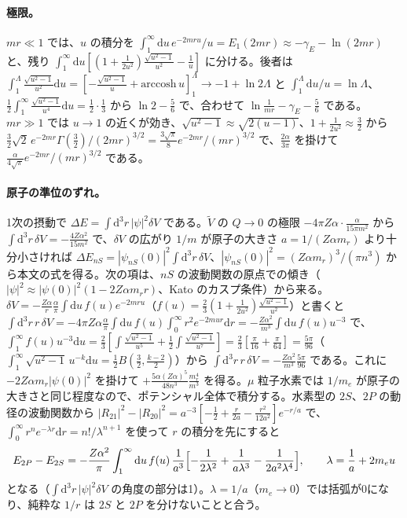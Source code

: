 \documentclass[a4paper,10pt]{ltjsarticle}
\newcommand{\dd}{\mathrm{d}}
\begin{document}
\paragraph{極限。}$mr\ll1$ では、$u$ の積分を $\int_1^\infty\dd u\,e^{-2mru}/u=E_1(2mr)\approx-\gamma_E-\ln(2mr)$ と、残り $\int_1^\infty\dd u[(1+\frac1{2u^2})\frac{\sqrt{u^2-1}}{u^2}-\frac1u]$ に分ける。後者は $\int_1^\Lambda\frac{\sqrt{u^2-1}}{u^2}\dd u=[-\frac{\sqrt{u^2-1}}{u}+\mathrm{arccosh}\,u]_1^\Lambda\to-1+\ln2\Lambda$ と $\int_1^\Lambda\dd u/u=\ln\Lambda$、$\frac12\int_1^\infty\frac{\sqrt{u^2-1}}{u^4}\dd u=\frac12\cdot\frac13$ から $\ln2-\frac56$ で、合わせて $\ln\frac1{mr}-\gamma_E-\frac56$ である。$mr\gg1$ では $u\to1$ の近くが効き、$\sqrt{u^2-1}\approx\sqrt{2(u-1)}$、$1+\frac1{2u^2}\approx\frac32$ から $\frac32\sqrt2\,e^{-2mr}\Gamma(\frac32)/(2mr)^{3/2}=\frac{3\sqrt\pi}{8}e^{-2mr}/(mr)^{3/2}$ で、$\frac{2\alpha}{3\pi}$ を掛けて $\frac{\alpha}{4\sqrt\pi}e^{-2mr}/(mr)^{3/2}$ である。

\paragraph{原子の準位のずれ。}1次の摂動で $\Delta E=\int\dd^3r\,|\psi|^2\delta V$ である。$\tilde V$ の $Q\to0$ の極限 $-4\pi Z\alpha\cdot\frac{\alpha}{15\pi m^2}$ から $\int\dd^3r\,\delta V=-\frac{4Z\alpha^2}{15m^2}$ で、$\delta V$ の広がり $1/m$ が原子の大きさ $a=1/(Z\alpha m_r)$ より十分小さければ $\Delta E_{nS}=|\psi_{nS}(0)|^2\int\dd^3r\,\delta V$、$|\psi_{nS}(0)|^2=(Z\alpha m_r)^3/(\pi n^3)$ から本文の式を得る。次の項は、$nS$ の波動関数の原点での傾き（$|\psi|^2\approx|\psi(0)|^2(1-2Z\alpha m_rr)$、Kato のカスプ条件）から来る。$\delta V=-\frac{Z\alpha}{r}\frac\alpha\pi\int\dd u\,f(u)e^{-2mru}$（$f(u)=\frac23(1+\frac1{2u^2})\frac{\sqrt{u^2-1}}{u^2}$）と書くと $\int\dd^3r\,r\,\delta V=-4\pi Z\alpha\frac\alpha\pi\int\dd u\,f(u)\int_0^\infty r^2e^{-2mur}\dd r=-\frac{Z\alpha^2}{m^3}\int\dd u\,f(u)u^{-3}$ で、$\int_1^\infty f(u)u^{-3}\dd u=\frac23[\int\frac{\sqrt{u^2-1}}{u^5}+\frac12\int\frac{\sqrt{u^2-1}}{u^7}]=\frac23[\frac\pi{16}+\frac\pi{64}]=\frac{5\pi}{96}$（$\int_1^\infty\sqrt{u^2-1}\,u^{-k}\dd u=\frac12B(\frac32,\frac{k-2}{2})$）から $\int\dd^3r\,r\,\delta V=-\frac{Z\alpha^2}{m^3}\frac{5\pi}{96}$ である。これに $-2Z\alpha m_r|\psi(0)|^2$ を掛けて $+\frac{5\alpha(Z\alpha)^5}{48n^3}\frac{m_r^4}{m^3}$ を得る。$\mu$ 粒子水素では $1/m_e$ が原子の大きさと同じ程度なので、ポテンシャル全体で積分する。水素型の $2S$、$2P$ の動径の波動関数から $|R_{21}|^2-|R_{20}|^2=a^{-3}[-\frac12+\frac{r}{2a}-\frac{r^2}{12a^2}]e^{-r/a}$ で、$\int_0^\infty r^ne^{-\lambda r}\dd r=n!/\lambda^{n+1}$ を使って $r$ の積分を先にすると
\begin{equation*}
E_{2P}-E_{2S}=-\frac{Z\alpha^2}{\pi}\int_1^\infty\dd u\,f(u)\,\frac{1}{a^3}\Bigl[-\frac{1}{2\lambda^2}+\frac{1}{a\lambda^3}-\frac{1}{2a^2\lambda^4}\Bigr],\qquad\lambda=\frac1a+2m_eu
\end{equation*}
となる（$\int\dd^3r\,|\psi|^2\delta V$ の角度の部分は1）。$\lambda=1/a$（$m_e\to0$）では括弧が0になり、純粋な $1/r$ は $2S$ と $2P$ を分けないことと合う。
\end{document}
